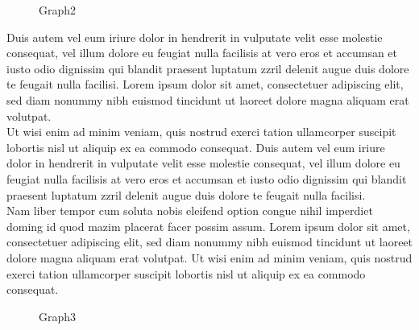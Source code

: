 \documentclass{scrartcl}
\begin{document}
\begin{wrapfigure}{r}{0.37\textwidth}
     \centering
     \caption{Graph2}
\end{wrapfigure}
Duis autem vel eum iriure dolor in hendrerit in vulputate velit esse molestie consequat, vel illum dolore eu feugiat nulla facilisis at vero eros et accumsan et iusto odio dignissim qui blandit praesent luptatum zzril delenit augue duis dolore te feugait nulla facilisi. Lorem ipsum dolor sit amet, consectetuer adipiscing elit, sed diam nonummy nibh euismod tincidunt ut laoreet dolore magna aliquam erat volutpat.   \\[8pt]
Ut wisi enim ad minim veniam, quis nostrud exerci tation ullamcorper suscipit lobortis nisl ut aliquip ex ea commodo consequat. Duis autem vel eum iriure dolor in hendrerit in vulputate velit esse molestie consequat, vel illum dolore eu feugiat nulla facilisis at vero eros et accumsan et iusto odio dignissim qui blandit praesent luptatum zzril delenit augue duis dolore te feugait nulla facilisi.   \\[8pt]
Nam liber tempor cum soluta nobis eleifend option congue nihil imperdiet doming id quod mazim placerat facer possim assum. Lorem ipsum dolor sit amet, consectetuer adipiscing  elit, sed diam nonummy nibh euismod tincidunt ut laoreet dolore magna aliquam erat volutpat. Ut wisi enim ad minim veniam, quis nostrud exerci tation ullamcorper suscipit lobortis nisl ut aliquip ex ea commodo consequat.  \\[8pt]
\begin{figure}[h!]
    \centering
    \caption{Graph3}
\end{figure}
\end{document}
